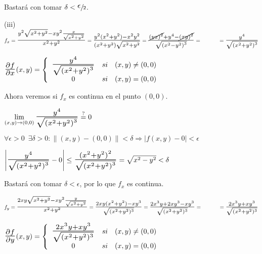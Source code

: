 \documentclass[10pt, titlepage]{article}
\newcommand{\eqc}[1]{\stackrel{\mathclap{\normalfont\mbox{\scriptsize{#1}}}}{=}}
\newcommand{\bfrac}[2]{\scalebox{1.4}{$\frac{#1}{#2}$}}
\newcommand{\spac}{\, \, \,}
\newcommand{\dindent}{\indent\indent}
\begin{document}
\dindent Bastará con tomar $\delta < \sfrac{\scalebox{1.5}{$\epsilon$}}{2}$.
\vspace{5mm}

\dindent (iii) $f_x = \bfrac{y^2 \sqrt{x^2 + y^2} - xy^2 \frac{x}{\sqrt{x^2 + y^2}}}{x^2 + y^2} = 
\bfrac{y^2 (x^2 + y^2) - x^2y^2}{(x^2 + y^2) \sqrt{x^2 + y^2}} = \bfrac{\cancel{{(yx)}^2} + y^4 - \cancel{{(xy)^2}}}{\sqrt{{(x^2 - y^2)}^3}} = \\ \dindent = \bfrac{y^4}{\sqrt{{(x^2 + y^2)}^3}}$
\vspace{3mm}

\dindent $\bfrac{\partial f}{\partial x} (x, y) = \left \{
\begin{array}{ccc}

\bfrac{y^4}{\sqrt{{(x^2 + y^2)}^3}} & si & (x, y) \neq (0, 0)\\
0 & si & (x, y) = (0, 0)\\

\end{array}\right .
$
\vspace{3mm}

\dindent Ahora veremos si $f_x$ es continua en el punto $(0, 0)$.
\vspace{3mm}

\dindent $\displaystyle \lim_{(x, y) \to (0, 0)} \bfrac{y^4}{\sqrt{{(x^2 + y^2)}^3}} \eqc{?} 0$
\vspace{3mm}

\dindent $\forall \epsilon > 0 \spac \exists \delta > 0 : \|(x ,y) - (0, 0)\| < \delta \Rightarrow |f (x, y) - 0| < 
\epsilon$
\vspace{3mm}

\dindent $\left | \bfrac{y^4}{\sqrt{{(x^2 + y^2)}^3}} - 0 \right | \leq \bfrac{{(x^2 + y^2)}^2} 
{\sqrt{{(x^2 + y^2)}^3}} = \sqrt{x^2 - y^2} < \delta$
\vspace{3mm}

\dindent Bastará con tomar $\delta < \epsilon$, por lo que $f_x$ es continua.
\vspace{5mm}

\dindent $f_y = \bfrac{2xy \sqrt{x^2 + y^2} - xy^2 \frac{y}{\sqrt{x^2 + y^2}}}{x^2 + y^2} = \bfrac{2xy 
(x^2 + y^2) - xy^3}{\sqrt{{(x^2 + y^2)^3}}} = \bfrac{2x^3y + 2xy^3 - xy^3}{\sqrt{{(x^2 + y^2)^3}}} 
= \\ \dindent = \bfrac{2x^3y + xy^3}{\sqrt{{(x^2 + y^2)^3}}}$
\vspace{3mm}

\dindent $\bfrac{\partial f}{\partial y} (x, y) = \left \{
\begin{array}{ccc}

\bfrac{2x^3y + xy^3}{\sqrt{{(x^2 + y^2)^3}}} & si & (x, y) \neq (0, 0)\\
0 & si & (x, y) = (0, 0)\\

\end{array}\right .
$
\vspace{3mm}
\end{document}

